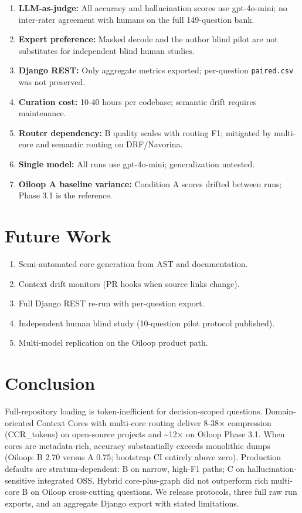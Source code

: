 \documentclass[11pt]{article}
\providecommand{\tightlist}{%
  \setlength{\itemsep}{2pt}%
  \setlength{\parskip}{0pt}%
}
\begin{document}
\begin{enumerate}
\def\labelenumi{\arabic{enumi}.}
\tightlist
\item
  \textbf{LLM-as-judge:} All accuracy and hallucination scores use
  gpt-4o-mini; no inter-rater agreement with humans on the full
  149-question bank.
\item
  \textbf{Expert preference:} Masked decode and the author blind pilot
  are not substitutes for independent blind human studies.
\item
  \textbf{Django REST:} Only aggregate metrics exported; per-question
  \texttt{paired.csv} was not preserved.
\item
  \textbf{Curation cost:} 10-40 hours per codebase; semantic drift
  requires maintenance.
\item
  \textbf{Router dependency:} B quality scales with routing F1;
  mitigated by multi-core and semantic routing on DRF/Navorina.
\item
  \textbf{Single model:} All runs use gpt-4o-mini; generalization
  untested.
\item
  \textbf{Oiloop A baseline variance:} Condition A scores drifted
  between runs; Phase 3.1 is the reference.
\end{enumerate}

\section{Future Work}\label{future-work}

\begin{enumerate}
\def\labelenumi{\arabic{enumi}.}
\tightlist
\item
  Semi-automated core generation from AST and documentation.
\item
  Context drift monitors (PR hooks when source links change).
\item
  Full Django REST re-run with per-question export.
\item
  Independent human blind study (10-question pilot protocol published).
\item
  Multi-model replication on the Oiloop product path.
\end{enumerate}

\section{Conclusion}\label{conclusion}

Full-repository loading is token-inefficient for decision-scoped
questions. Domain-oriented Context Cores with multi-core routing deliver
8-38× compression (CCR\_tokens) on open-source projects and
\textasciitilde12× on Oiloop Phase 3.1. When cores are metadata-rich,
accuracy substantially exceeds monolithic dumps (Oiloop: B 2.70 versus A
0.75; bootstrap CI entirely above zero). Production defaults are
stratum-dependent: B on narrow, high-F1 paths; C on
hallucination-sensitive integrated OSS. Hybrid core-plus-graph did not
outperform rich multi-core B on Oiloop cross-cutting questions. We
release protocols, three full raw run exports, and an aggregate Django
export with stated limitations.
\end{document}
